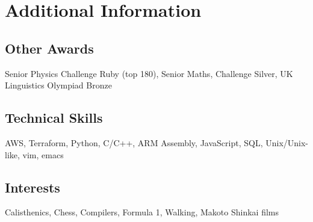 \section{Additional Information}
\subsection{Other Awards}{}{\hfill Senior Physics Challenge Ruby (top 180), Senior Maths, Challenge Silver, UK Linguistics Olympiad Bronze}
\subsection{Technical Skills}{}{\hspace{10mm}AWS, Terraform, Python, C/C+{+}, ARM Assembly, JavaScript, SQL, Unix/Unix-like, vim, emacs}
\subsection{Interests}{}{\hfill Calisthenics, Chess, Compilers, Formula 1, Walking, Makoto Shinkai films}
